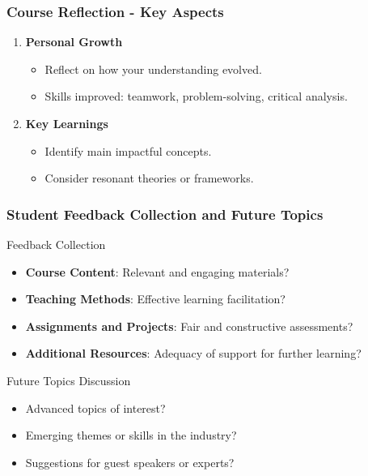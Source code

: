 \documentclass[aspectratio=169]{beamer}
\begin{document}
\begin{frame}[fragile]
  \frametitle{Course Reflection - Key Aspects}
  \begin{enumerate}
    \item \textbf{Personal Growth}
    \begin{itemize}
      \item Reflect on how your understanding evolved.
      \item Skills improved: teamwork, problem-solving, critical analysis.
    \end{itemize}
    
    \item \textbf{Key Learnings}
    \begin{itemize}
      \item Identify main impactful concepts.
      \item Consider resonant theories or frameworks.
    \end{itemize}
  \end{enumerate}
\end{frame}

\begin{frame}[fragile]
  \frametitle{Student Feedback Collection and Future Topics}
  \begin{block}{Feedback Collection}
    \begin{itemize}
      \item \textbf{Course Content}: Relevant and engaging materials?
      \item \textbf{Teaching Methods}: Effective learning facilitation?
      \item \textbf{Assignments and Projects}: Fair and constructive assessments?
      \item \textbf{Additional Resources}: Adequacy of support for further learning?
    \end{itemize}
  \end{block}
  
  \begin{block}{Future Topics Discussion}
    \begin{itemize}
      \item Advanced topics of interest?
      \item Emerging themes or skills in the industry?
      \item Suggestions for guest speakers or experts?
    \end{itemize}
  \end{block}
\end{frame}
\end{document}
